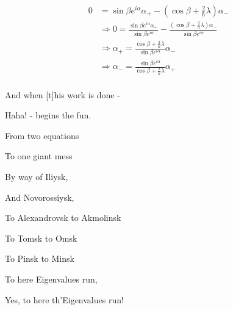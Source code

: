\begin{answer}
  \begin{equation}
    \begin{split}
      0
      &= \sin{\beta}e^{i\alpha}\alpha_+ - (\cos{\beta} + \frac{2}{\hbar}\lambda)\alpha_-\\
      &\Rightarrow
      0 = \frac{\sin{\beta}e^{i\alpha}\alpha_+}{\sin{\beta}e^{i\alpha}} - \frac{(\cos{\beta} + \frac{2}{\hbar}\lambda)\alpha_-}{\sin{\beta}e^{i\alpha}}\\
      &\Rightarrow
      \alpha_+ = \frac{\cos{\beta} + \frac{2}{\hbar}\lambda}{\sin{\beta}e^{i\alpha}}\alpha_-\\
      &\Rightarrow
      \alpha_- = \frac{\sin{\beta}e^{i\alpha}}{\cos{\beta} + \frac{2}{\hbar}\lambda}\alpha_+\\
    \end{split}
  \end{equation}

\noindent And when [t]his work is done -

\noindent Haha! - begins the fun.

\noindent From two equations

\noindent To one giant mess 

\noindent By way of Iliysk,

\noindent And Novorossiysk,

\noindent To Alexandrovsk to Akmolinsk

\noindent To Tomsk to Omsk

\noindent To Pinsk to Minsk

\noindent To here Eigenvalues run,

\noindent Yes, to here th'Eigenvalues run!


\end{answer}

